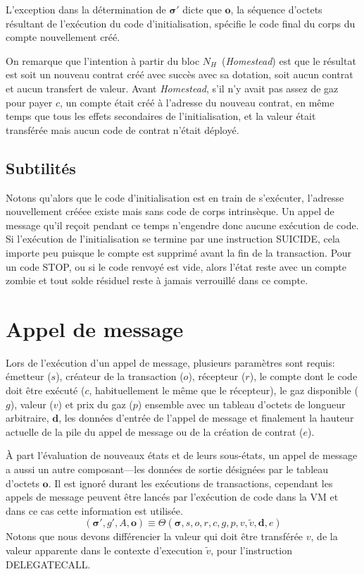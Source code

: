 \documentclass[9pt,oneside]{amsart}
\newcommand{\firsthomesteadblock}{\ensuremath{N_H}}
\begin{document}
\begin{multicols}{2}
L'exception dans la détermination de $\boldsymbol{\sigma}'$ dicte que $\mathbf{o}$, la séquence d'octets résultant de l'exécution du code d'initialisation, spécifie le code final du corps du compte nouvellement créé.

On remarque que l'intention à partir du bloc \firsthomesteadblock\  ({\it Homestead}) est que le résultat est soit un nouveau contrat créé avec succès avec sa dotation, soit aucun contrat et aucun transfert de valeur. Avant {\it Homestead}, s'il n'y avait pas assez de gaz pour payer $c$, un compte était créé à l'adresse du nouveau contrat, en même temps que tous les effets secondaires de l'initialisation, et la valeur était transférée mais aucun code de contrat n'était déployé.

\subsection{Subtilités}
Notons qu'alors que le code d'initialisation est en train de s'exécuter, l'adresse nouvellement crééee existe mais sans code de corps intrinsèque. Un appel de message qu'il reçoit pendant ce temps n'engendre donc aucune exécution de code. Si l'exécution de l'initialisation se termine par une instruction {\small SUICIDE}, cela importe peu puisque le compte est supprimé avant la fin de la transaction. Pour un code {\small STOP}, ou si le code renvoyé est vide, alors l'état reste avec un compte zombie et tout solde résiduel reste à jamais verrouillé dans ce compte.

\section{Appel de message} \label{ch:call}
Lors de l'exécution d'un appel de message, plusieurs paramètres sont requis: émetteur ($s$), créateur de la transaction ($o$), récepteur ($r$), le compte dont le code doit être exécuté ($c$, habituellement le même que le récepteur), le gaz disponible ($g$), valeur ($v$) et prix du gaz ($p$) ensemble avec un tableau d'octets de longueur arbitraire, $\mathbf{d}$, les données d'entrée de l'appel de message et finalement la hauteur actuelle de la pile du appel de message ou de la création de contrat ($e$).

À part l'évaluation de nouveaux états et de leurs sous-états, un appel de message a aussi un autre composant---les données de sortie désignées par le tableau d'octets $\mathbf{o}$. Il est ignoré durant les exécutions de transactions, cependant les appels de message peuvent être lancés par l'exécution de code dans la VM et dans ce cas cette information est utilisée.
\begin{equation}
(\boldsymbol{\sigma}', g', A, \mathbf{o}) \equiv \Theta(\boldsymbol{\sigma}, s, o, r, c, g, p, v, \tilde{v}, \mathbf{d}, e)
\end{equation}
Notons que nous devons différencier la valeur qui doit être transférée $v$, de la valeur apparente dans le contexte d'execution $\tilde{v}$, pour l'instruction {\small DELEGATECALL}.


\end{multicols}
\end{document}
